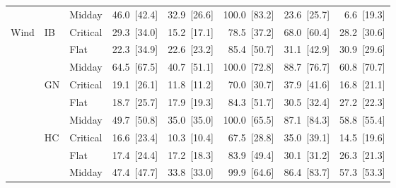 \begin{tabular}{l l l r r r r r}
 &  & Midday & 46.0~{\color{seasoncol}\scriptsize[42.4]} & 32.9~{\color{seasoncol}\scriptsize[26.6]} & 100.0~{\color{seasoncol}\scriptsize[83.2]} & 23.6~{\color{seasoncol}\scriptsize[25.7]} & 6.6~{\color{seasoncol}\scriptsize[19.3]} \\
\addlinespace
Wind & IB & Critical & 29.3~{\color{seasoncol}\scriptsize[34.0]} & 15.2~{\color{seasoncol}\scriptsize[17.1]} & 78.5~{\color{seasoncol}\scriptsize[37.2]} & 68.0~{\color{seasoncol}\scriptsize[60.4]} & 28.2~{\color{seasoncol}\scriptsize[30.6]} \\
 &  & Flat & 22.3~{\color{seasoncol}\scriptsize[34.9]} & 22.6~{\color{seasoncol}\scriptsize[23.2]} & 85.4~{\color{seasoncol}\scriptsize[50.7]} & 31.1~{\color{seasoncol}\scriptsize[42.9]} & 30.9~{\color{seasoncol}\scriptsize[29.6]} \\
 &  & Midday & 64.5~{\color{seasoncol}\scriptsize[67.5]} & 40.7~{\color{seasoncol}\scriptsize[51.1]} & 100.0~{\color{seasoncol}\scriptsize[72.8]} & 88.7~{\color{seasoncol}\scriptsize[76.7]} & 60.8~{\color{seasoncol}\scriptsize[70.7]} \\
 & GN & Critical & 19.1~{\color{seasoncol}\scriptsize[26.1]} & 11.8~{\color{seasoncol}\scriptsize[11.2]} & 70.0~{\color{seasoncol}\scriptsize[30.7]} & 37.9~{\color{seasoncol}\scriptsize[41.6]} & 16.8~{\color{seasoncol}\scriptsize[21.1]} \\
 &  & Flat & 18.7~{\color{seasoncol}\scriptsize[25.7]} & 17.9~{\color{seasoncol}\scriptsize[19.3]} & 84.3~{\color{seasoncol}\scriptsize[51.7]} & 30.5~{\color{seasoncol}\scriptsize[32.4]} & 27.2~{\color{seasoncol}\scriptsize[22.3]} \\
 &  & Midday & 49.7~{\color{seasoncol}\scriptsize[50.8]} & 35.0~{\color{seasoncol}\scriptsize[35.0]} & 100.0~{\color{seasoncol}\scriptsize[65.5]} & 87.1~{\color{seasoncol}\scriptsize[84.3]} & 58.8~{\color{seasoncol}\scriptsize[55.4]} \\
 & HC & Critical & 16.6~{\color{seasoncol}\scriptsize[23.4]} & 10.3~{\color{seasoncol}\scriptsize[10.4]} & 67.5~{\color{seasoncol}\scriptsize[28.8]} & 35.0~{\color{seasoncol}\scriptsize[39.1]} & 14.5~{\color{seasoncol}\scriptsize[19.6]} \\
 &  & Flat & 17.4~{\color{seasoncol}\scriptsize[24.4]} & 17.2~{\color{seasoncol}\scriptsize[18.3]} & 83.9~{\color{seasoncol}\scriptsize[49.4]} & 30.1~{\color{seasoncol}\scriptsize[31.2]} & 26.3~{\color{seasoncol}\scriptsize[21.3]} \\
 &  & Midday & 47.4~{\color{seasoncol}\scriptsize[47.7]} & 33.8~{\color{seasoncol}\scriptsize[33.0]} & 99.9~{\color{seasoncol}\scriptsize[64.6]} & 86.4~{\color{seasoncol}\scriptsize[83.7]} & 57.3~{\color{seasoncol}\scriptsize[53.3]} \\

\end{tabular}
